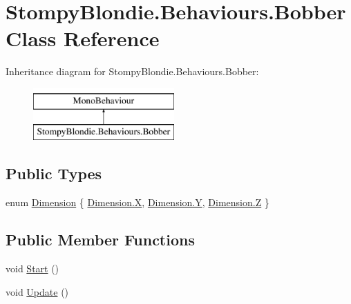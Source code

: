 \hypertarget{class_stompy_blondie_1_1_behaviours_1_1_bobber}{}\section{Stompy\+Blondie.\+Behaviours.\+Bobber Class Reference}
\label{class_stompy_blondie_1_1_behaviours_1_1_bobber}
Inheritance diagram for Stompy\+Blondie.\+Behaviours.\+Bobber\+:\begin{figure}[H]
\begin{center}
\leavevmode
\includegraphics[height=2.000000cm]{class_stompy_blondie_1_1_behaviours_1_1_bobber}
\end{center}
\end{figure}
\subsection*{Public Types}
\begin{DoxyCompactItemize}
\item 
enum \mbox{\hyperlink{class_stompy_blondie_1_1_behaviours_1_1_bobber_aa5824e905d1992e924d9755659a7717e}{Dimension}} \{ \mbox{\hyperlink{class_stompy_blondie_1_1_behaviours_1_1_bobber_aa5824e905d1992e924d9755659a7717ea02129bb861061d1a052c592e2dc6b383}{Dimension.\+X}}, 
\mbox{\hyperlink{class_stompy_blondie_1_1_behaviours_1_1_bobber_aa5824e905d1992e924d9755659a7717ea57cec4137b614c87cb4e24a3d003a3e0}{Dimension.\+Y}}, 
\mbox{\hyperlink{class_stompy_blondie_1_1_behaviours_1_1_bobber_aa5824e905d1992e924d9755659a7717ea21c2e59531c8710156d34a3c30ac81d5}{Dimension.\+Z}}
 \}
\end{DoxyCompactItemize}
\subsection*{Public Member Functions}
\begin{DoxyCompactItemize}
\item 
void \mbox{\hyperlink{class_stompy_blondie_1_1_behaviours_1_1_bobber_aaa2f97e7e7532fc665a6284dd275ba71}{Start}} ()
\item 
void \mbox{\hyperlink{class_stompy_blondie_1_1_behaviours_1_1_bobber_a561d9d22d20aaa4091ed153b866d029c}{Update}} ()
\end{DoxyCompactItemize}

